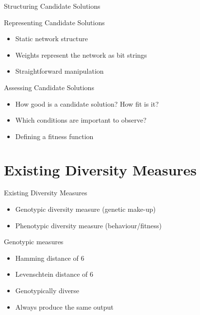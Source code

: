 
\begin{frame}{Structuring Candidate Solutions}
  \begin{center}
    
  \end{center}
\end{frame}

\begin{frame}{Representing Candidate Solutions}
  \begin{itemize}
    \item Static network structure
    \item Weights represent the network as bit strings
    \item Straightforward manipulation
  \end{itemize}
\end{frame}

\begin{frame}{Assessing Candidate Solutions}
  \begin{itemize}
    \item How good is a candidate solution? How fit is it?
    \item Which conditions are important to observe?
    \item Defining a fitness function
  \end{itemize}
\end{frame}

\section{Existing Diversity Measures}

\begin{frame}{Existing Diversity Measures}
  \begin{itemize}
    \item Genotypic diversity measure (genetic make-up)
    \item Phenotypic diversity measure (behaviour/fitness)
  \end{itemize}
\end{frame}

\begin{frame}{Genotypic measures}
  

  \begin{itemize}
    \item Hamming distance of 6
    \item Levenschtein distance of 6
    \item Genotypically diverse
    \item Always produce the same output
  \end{itemize}
\end{frame}

